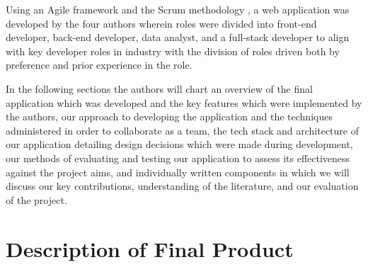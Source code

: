 \documentclass[]{UCD_CS_47360_Report}
\begin{document}
Using an Agile framework and the Scrum methodology \cite{Scrum-Guide}, a web application was developed by the four authors wherein roles were divided into front-end developer, back-end developer, data analyst, and a full-stack developer to align with key developer roles in industry \cite{SO-Survey} with the division of roles driven both by preference and prior experience in the role.

In the following sections the authors will chart an overview of the final application which was developed and the key features which were implemented by the authors, our approach to developing the application and the techniques administered in order to collaborate as a team, the tech stack and architecture of our application detailing design decisions which were made during development, our methods of evaluating and testing our application to assess its effectiveness against the project aims, and individually written components in which we will discuss our key contributions, understanding of the literature, and our evaluation of the project.

\chapter{\label{chapter2}Description of Final Product}
\end{document}
